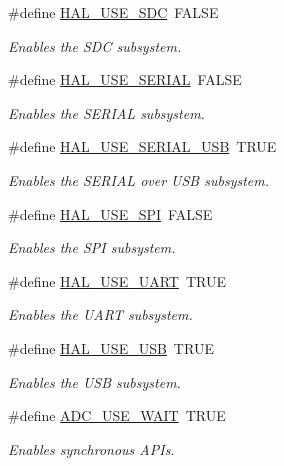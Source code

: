 \begin{DoxyCompactItemize}
\#define \hyperlink{group___h_a_l___c_o_n_f_ga06f315a18b911f426da736c42ab20325}{H\+A\+L\+\_\+\+U\+S\+E\+\_\+\+S\+D\+C}~F\+A\+L\+S\+E
\begin{DoxyCompactList}\small\item\em Enables the S\+D\+C subsystem. \end{DoxyCompactList}\item 
\#define \hyperlink{group___h_a_l___c_o_n_f_ga720d92b9c3a00d952f6f0c8665b54ebb}{H\+A\+L\+\_\+\+U\+S\+E\+\_\+\+S\+E\+R\+I\+A\+L}~F\+A\+L\+S\+E
\begin{DoxyCompactList}\small\item\em Enables the S\+E\+R\+I\+A\+L subsystem. \end{DoxyCompactList}\item 
\#define \hyperlink{group___h_a_l___c_o_n_f_ga79c970fb20565143ad8b65720c0b2d0e}{H\+A\+L\+\_\+\+U\+S\+E\+\_\+\+S\+E\+R\+I\+A\+L\+\_\+\+U\+S\+B}~T\+R\+U\+E
\begin{DoxyCompactList}\small\item\em Enables the S\+E\+R\+I\+A\+L over U\+S\+B subsystem. \end{DoxyCompactList}\item 
\#define \hyperlink{group___h_a_l___c_o_n_f_ga33a3c5bee9ed1f665aace8b88fed9b2b}{H\+A\+L\+\_\+\+U\+S\+E\+\_\+\+S\+P\+I}~F\+A\+L\+S\+E
\begin{DoxyCompactList}\small\item\em Enables the S\+P\+I subsystem. \end{DoxyCompactList}\item 
\#define \hyperlink{group___h_a_l___c_o_n_f_ga73220cad2edf2aee77b7ce1b53cacff0}{H\+A\+L\+\_\+\+U\+S\+E\+\_\+\+U\+A\+R\+T}~T\+R\+U\+E
\begin{DoxyCompactList}\small\item\em Enables the U\+A\+R\+T subsystem. \end{DoxyCompactList}\item 
\#define \hyperlink{group___h_a_l___c_o_n_f_gafc8f8fc6010f46f5baae4a369e14974e}{H\+A\+L\+\_\+\+U\+S\+E\+\_\+\+U\+S\+B}~T\+R\+U\+E
\begin{DoxyCompactList}\small\item\em Enables the U\+S\+B subsystem. \end{DoxyCompactList}\item 
\#define \hyperlink{group___h_a_l___c_o_n_f_ga39e892a4090185fbdda9bb105bc03b4f}{A\+D\+C\+\_\+\+U\+S\+E\+\_\+\+W\+A\+I\+T}~T\+R\+U\+E
\begin{DoxyCompactList}\small\item\em Enables synchronous A\+P\+Is. \end{DoxyCompactList}\item 

\end{DoxyCompactItemize}
